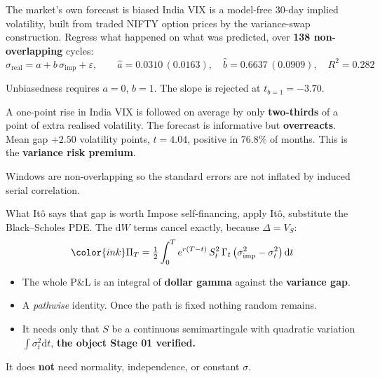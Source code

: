 \documentclass[aspectratio=169,11pt]{beamer}
\newcommand{\lead}[1]{{\sffamily\bfseries\color{accent}#1}}
\newcommand{\dd}{\mathrm{d}}
\newcommand{\half}{\tfrac{1}{2}}
\newcommand{\si}{\sigma_{\mathrm{imp}}}
\newcommand{\sr}{\sigma_{\mathrm{real}}}
\begin{document}
\begin{frame}{The market's own forecast is biased}
India VIX is a model-free 30-day implied volatility, built from traded NIFTY option prices by
the variance-swap construction. Regress what happened on what was predicted, over
\textbf{138 non-overlapping} cycles:
\vspace{-0.1em}
\[\sr=a+b\,\si+\varepsilon,\qquad
  \hat a=0.0310\,(0.0163),\quad \hat b=0.6637\,(0.0909),\quad R^2=0.282\]
\vspace{-0.9em}

Unbiasedness requires $a=0$, $b=1$. The slope is rejected at $t_{b=1}=\mathbf{-3.70}$.
\vspace{0.6em}
\begin{callout}
A one-point rise in India VIX is followed on average by only \textbf{two-thirds} of a point of
extra realised volatility. The forecast is informative but \textbf{overreacts}. Mean gap
$\mathbf{+2.50}$ volatility points, $t=4.04$, positive in $\mathbf{76.8\%}$ of months. This is
the \textbf{variance risk premium}.
\end{callout}
\vspace{0.3em}
{\footnotesize\color{muted}Windows are non-overlapping so the standard errors are not inflated
by induced serial correlation.}
\end{frame}

\begin{frame}{What It\^o says that gap is worth}
Impose self-financing, apply It\^o, substitute the Black--Scholes PDE. The $\dd W$ terms cancel
exactly, because $\Delta=V_S$:
\vspace{-0.1em}
\[{\color{ink}\Pi_T=\half\int_0^T e^{r(T-t)}\,S_t^2\,\Gamma_t\,\big(\si^2-\sigma_t^2\big)\,\dd t}\]
\vspace{-0.9em}
\begin{itemize}
  \item The whole P\&L is an integral of \textbf{dollar gamma} against the
        \textbf{variance gap}.
  \item A \emph{pathwise} identity. Once the path is fixed nothing random remains.
  \item It needs only that $S$ be a continuous semimartingale with quadratic variation
        $\int\sigma_t^2\dd t$, \lead{the object Stage 01 verified.}
\end{itemize}
\vspace{0.4em}
It does \textbf{not} need normality, independence, or constant $\sigma$.
\end{frame}
\end{document}
